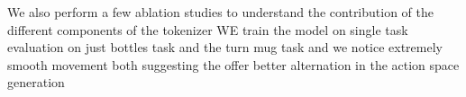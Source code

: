 We also perform a few ablation studies to understand the contribution of the different components of the tokenizer
WE train the model on single task evaluation on just bottles task and the turn mug task and we  notice extremely 
smooth movement both suggesting the offer better alternation in the action space generation 

